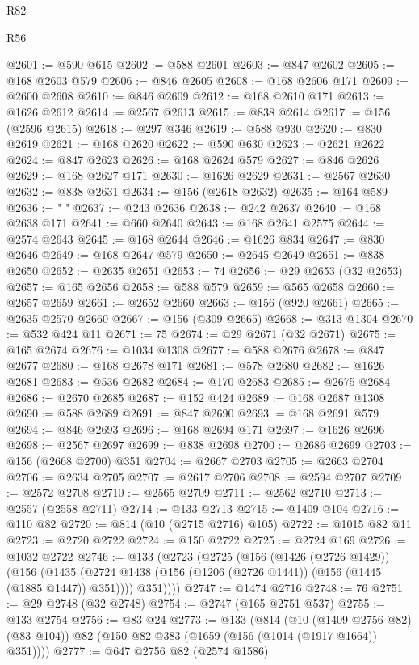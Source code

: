 \begin{lexlean}{R82}
\begin{lexlean}{R56}
\begin{coremodule}
{{{{{{{{{{{{{{{{{{{{{{{{{{{{{{{{{{{{{{{{{{{{{{{{{{{{{{{{{{{{{{{{{{{{{{{{{{{{{{{{{{{{{{{{{{{{{{{{{{{{{{{{{{{{{{{{{{{{{{{{{{{{{{{{{{{{{{{{{{{{{{{{{{{{{{{{{{{{{{{{{{{{{{{{{{{{{{{{{{{{{{{{{{{{{{{{{{{{{{{{{{{{{{{{{{{@2601 := @590 @615
@2602 := @588 @2601
@2603 := @847 @2602
@2605 := @168 @2603 @579
@2606 := @846 @2605
@2608 := @168 @2606 @171
@2609 := @2600 @2608
@2610 := @846 @2609
@2612 := @168 @2610 @171
@2613 := @1626 @2612
@2614 := @2567 @2613
@2615 := @838 @2614
@2617 := @156 (@2596 @2615)
@2618 := @297 @346
@2619 := @588 @930
@2620 := @830 @2619
@2621 := @168 @2620
@2622 := @590 @630
@2623 := @2621 @2622
@2624 := @847 @2623
@2626 := @168 @2624 @579
@2627 := @846 @2626
@2629 := @168 @2627 @171
@2630 := @1626 @2629
@2631 := @2567 @2630
@2632 := @838 @2631
@2634 := @156 (@2618 @2632)
@2635 := @164 @589
@2636 := " "
@2637 := @243 @2636
@2638 := @242 @2637
@2640 := @168 @2638 @171
@2641 := @660 @2640
@2643 := @168 @2641 @2575
@2644 := @2574 @2643
@2645 := @168 @2644
@2646 := @1626 @834
@2647 := @830 @2646
@2649 := @168 @2647 @579
@2650 := @2645 @2649
@2651 := @838 @2650
@2652 := @2635 @2651
@2653 := 74
@2656 := @29 @2653 (@32 @2653)
@2657 := @165 @2656
@2658 := @588 @579
@2659 := @565 @2658
@2660 := @2657 @2659
@2661 := @2652 @2660
@2663 := @156 (@920 @2661)
@2665 := @2635 @2570 @2660
@2667 := @156 (@309 @2665)
@2668 := @313 @1304
@2670 := @532 @424 @11
@2671 := 75
@2674 := @29 @2671 (@32 @2671)
@2675 := @165 @2674
@2676 := @1034 @1308
@2677 := @588 @2676
@2678 := @847 @2677
@2680 := @168 @2678 @171
@2681 := @578 @2680
@2682 := @1626 @2681
@2683 := @536 @2682
@2684 := @170 @2683
@2685 := @2675 @2684
@2686 := @2670 @2685
@2687 := @152 @424
@2689 := @168 @2687 @1308
@2690 := @588 @2689
@2691 := @847 @2690
@2693 := @168 @2691 @579
@2694 := @846 @2693
@2696 := @168 @2694 @171
@2697 := @1626 @2696
@2698 := @2567 @2697
@2699 := @838 @2698
@2700 := @2686 @2699
@2703 := @156 (@2668 @2700) @351
@2704 := @2667 @2703
@2705 := @2663 @2704
@2706 := @2634 @2705
@2707 := @2617 @2706
@2708 := @2594 @2707
@2709 := @2572 @2708
@2710 := @2565 @2709
@2711 := @2562 @2710
@2713 := @2557 (@2558 @2711)
@2714 := @133 @2713
@2715 := @1409 @104
@2716 := @110 @82
@2720 := @814 (@10 (@2715 @2716) @105)
@2722 := @1015 @82 @11
@2723 := @2720 @2722
@2724 := @150 @2722
@2725 := @2724 @169
@2726 := @1032 @2722
@2746 := @133
    (@2723
      (@2725
        (@156
          (@1426 (@2726 @1429))
          (@156
            (@1435 (@2724 @1438 (@156 (@1206 (@2726 @1441)) (@156 (@1445 (@1885 @1447)) @351))))
            @351))))
@2747 := @1474 @2716
@2748 := 76
@2751 := @29 @2748 (@32 @2748)
@2754 := @2747 (@165 @2751 @537)
@2755 := @133 @2754
@2756 := @83 @24
@2773 := @133
    (@814
      (@10 (@1409 @2756 @82) (@83 @104))
      @82
      (@150 @82 @383 (@1659 (@156 (@1014 (@1917 @1664)) @351))))
@2777 := @647 @2756 @82 (@2574 @1586)
}}}}}}}}}}}}}}}}}}}}}}}}}}}}}}}}}}}}}}}}}}}}}}}}}}}}}}}}}}}}}}}}}}}}}}}}}}}}}}}}}}}}}}}}}}}}}}}}}}}}}}}}}}}}}}}}}}}}}}}}}}}}}}}}}}}}}}}}}}}}}}}}}}}}}}}}}}}}}}}}}}}}}}}}}}}}}}}}}}}}}}}}}}}}}}}}}}}}}}}}}}}}}}}}}}}
\end{coremodule}
\end{lexlean}
\end{lexlean}
